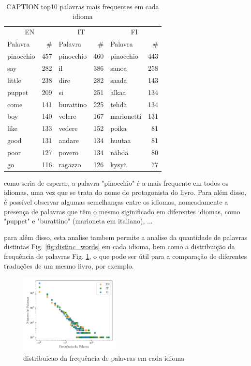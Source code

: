 \documentclass[mirror, portugues]{revdetua}
\begin{document}
\begin{table}[H]
\centering
\caption{CAPTION top10 palavras mais frequentes em cada idioma}
\label{table:top10_exatos}
\begin{tabular}{lrlrlr}
\toprule
\multicolumn{2}{c}{EN} & \multicolumn{2}{c}{IT} & \multicolumn{2}{c}{FI} \\
Palavra & \# & Palavra & \# & Palavra & \# \\
\midrule
pinocchio & 457 & pinocchio & 460 & pinocchio & 443 \\
say & 282 & il & 386 & sanoa & 258 \\
little & 238 & dire & 282 & saada & 143 \\
puppet & 209 & si & 251 & alkaa & 134 \\
come & 141 & burattino & 225 & tehdä & 134 \\
boy & 140 & volere & 167 & marionetti & 131 \\
like & 133 & vedere & 152 & poika & 81 \\
good & 131 & andare & 134 & huutaa & 81 \\
poor & 127 & povero & 134 & nähdä & 80 \\
go & 116 & ragazzo & 126 & kysyä & 77 \\
\bottomrule
\end{tabular}
\end{table}


como seria de esperar, a palavra "pinocchio" é a mais frequente em todos os idiomas, uma vez que se trata do nome do protagonista do livro. Para além disso, é possível observar algumas semelhanças entre os idiomas, nomeadamente a presença de palavras que têm o mesmo siginificado em diferentes idiomas, como "puppet" e "burattino" (marioneta em italiano), ...

para além disso, esta analise tambem permite a analise da quantidade de palavras distintas Fig. \ref{fig:distinc_words} em cada idioma, bem como a distribuição da frequência de palavras Fig. \ref{fig:word_freqs}, o que pode ser útil para a comparação de diferentes traduções de um mesmo livro, por exemplo.

\begin{figure}[H]
    \centering
    \includegraphics[width=0.45\textwidth]{../assets/exact_word_freqs.png}
    \caption{distribuicao da frequência de palavras em cada idioma}
    \label{fig:word_freqs}
\end{figure}
\end{document}
